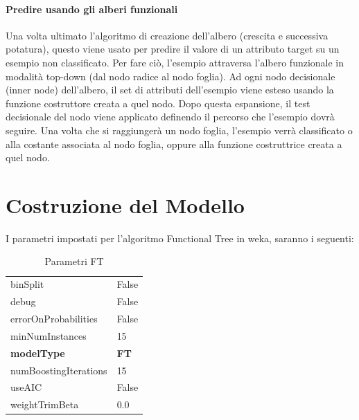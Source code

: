 \paragraph{Predire usando gli alberi funzionali}
Una volta ultimato l'algoritmo di creazione dell'albero (crescita e successiva potatura), questo viene usato per predire il valore di un attributo target su un esempio non classificato. Per fare ciò, l'esempio attraversa l'albero funzionale in modalità top-down (dal nodo radice al nodo foglia). Ad ogni nodo decisionale (inner node) dell'albero, il set di attributi dell'esempio viene esteso usando la funzione costruttore creata a quel nodo. Dopo questa espansione, il test decisionale del nodo viene applicato definendo il percorso che l'esempio dovrà seguire. Una volta che si raggiungerà un nodo foglia, l'esempio verrà classificato o alla costante associata al nodo foglia, oppure alla funzione costruttrice creata a quel nodo.

\section{Costruzione del Modello}
I parametri impostati per l'algoritmo Functional Tree in weka, saranno i seguenti:
\begin{table}[htbp]
	\begin{center}		
	\begin{tabular}{ l | l }
		binSplit & False \\
		debug & False \\
		errorOnProbabilities & False \\
		minNumInstances & 15 \\
		\textbf{modelType} & \textbf{FT} \\
		numBoostingIterations & 15 \\
		useAIC & False \\
		weightTrimBeta & 0.0 \\
	\end{tabular}
	\caption{Parametri FT}
	\end{center}
\end{table}

